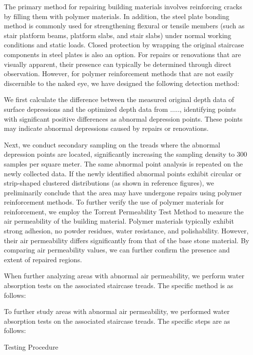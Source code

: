 \documentclass{mcmthesis}
\begin{document}
The primary method for repairing building materials involves reinforcing cracks by filling them with polymer materials\cite{ YTLX200401034}. In addition, the steel plate bonding method is commonly used for strengthening flexural or tensile members (such as stair platform beams, platform slabs, and stair slabs) under normal working conditions and static loads. Closed protection by wrapping the original staircase components in steel plates is also an option.
For repairs or renovations that are visually apparent, their presence can typically be determined through direct observation. However, for polymer reinforcement methods that are not easily discernible to the naked eye, we have designed the following detection method:

We first calculate the difference between the measured original depth data of surface depressions and the optimized depth data from ....., identifying points with significant positive differences as abnormal depression points. These points may indicate abnormal depressions caused by repairs or renovations.

Next, we conduct secondary sampling on the treads where the abnormal depression points are located, significantly increasing the sampling density to 300 samples per square meter. The same abnormal point analysis is repeated on the newly collected data. If the newly identified abnormal points exhibit circular or strip-shaped clustered distributions (as shown in reference figures), we preliminarily conclude that the area may have undergone repairs using polymer reinforcement methods.
To further verify the use of polymer materials for reinforcement, we employ the Torrent Permeability Test Method to measure the air permeability of the building material\cite{sena2015non}. Polymer materials typically exhibit strong adhesion, no powder residues, water resistance, and polishability. However, their air permeability differs significantly from that of the base stone material. By comparing air permeability values, we can further confirm the presence and extent of repaired regions.

When further analyzing areas with abnormal air permeability, we perform water absorption tests on the associated staircase treads. The specific method is as follows:

To further study areas with abnormal air permeability, we performed water absorption tests on the associated staircase treads. The specific steps are as follows:


Testing Procedure
\end{document}
